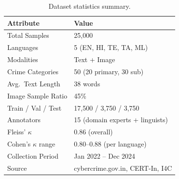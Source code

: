 \begin{table}[htbp]
\caption{Dataset statistics summary.}
\centering
\small
\setlength{\tabcolsep}{6pt}
\renewcommand{\arraystretch}{1.15}
\begin{tabular}{ll}
\toprule
\rowcolor{headerblue}
\textbf{Attribute} & \textbf{Value} \\
\midrule
Total Samples          & 25,000 \\
Languages              & 5 (EN, HI, TE, TA, ML) \\
Modalities             & Text + Image \\
Crime Categories       & 50 (20 primary, 30 sub) \\
Avg.\ Text Length      & 38 words \\
Image Sample Ratio     & 45\% \\
Train / Val / Test     & 17,500 / 3,750 / 3,750 \\
Annotators             & 15 (domain experts + linguists) \\
Fleiss' $\kappa$       & 0.86 (overall) \\
Cohen's $\kappa$ range & 0.80--0.88 (per language) \\
Collection Period      & Jan 2022 -- Dec 2024 \\
Source                 & cybercrime.gov.in, CERT-In, I4C \\
\bottomrule
\end{tabular}
\label{tab:dataset}
\end{table}